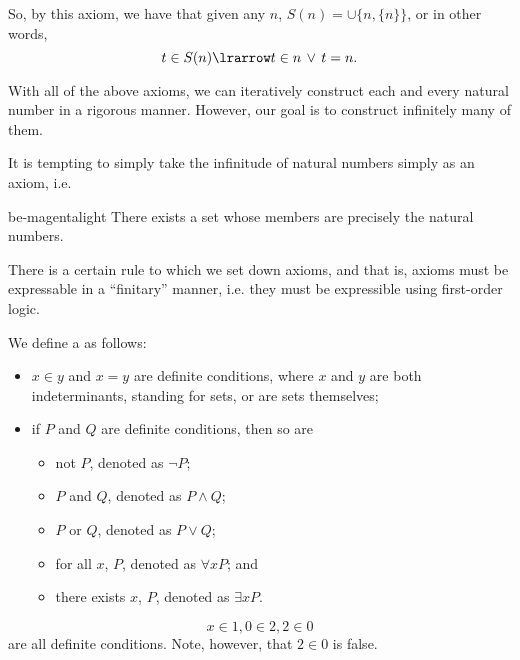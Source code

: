 \documentclass[notoc,notitlepage]{tufte-book}
\begin{document}
So, by this axiom, we have that given any $n$, $S(n) = \cup \{ n, \{ n \} \}$, or in other words,
\begin{equation*}
  t \in S(n) \lrarrow t \in n \, \lor \, t = n.
\end{equation*}

With all of the above axioms, we can iteratively construct each and every natural number in a rigorous manner. However, our goal is to construct infinitely many of them.

It is tempting to simply take the infinitude of natural numbers simply as an axiom, i.e.

\begin{quotebox}{be-magenta}{light}\label{sp:natural_numbers_axiom}
  There exists a set whose members are precisely the natural numbers.
\end{quotebox}

There is a certain rule to which we set down axioms, and that is, axioms must be expressable in a ``finitary'' manner, i.e. they must be expressible using first-order logic.

\begin{defn}
\label{defn:definite_condition}
  We define a  as follows:
  \begin{itemize}
    \item $x \in y$ and $x = y$ are definite conditions, where $x$ and $y$ are both indeterminants, standing for sets, or are sets themselves;
    \item if $P$ and $Q$ are definite conditions, then so are
      \begin{itemize}
        \item not $P$, denoted as $\neg P$;
        \item $P$ and $Q$, denoted as $P \land Q$;
        \item $P$ or $Q$, denoted as $P \lor Q$;
        \item for all $x$, $P$, denoted as $\forall x P$; and
        \item there exists $x$, $P$, denoted as $\exists x P$.
      \end{itemize}
  \end{itemize}
\end{defn}

\begin{eg}
  \begin{equation*}
    x \in 1, 0 \in 2 , 2 \in 0
  \end{equation*}
  are all definite conditions. Note, however, that $2 \in 0$ is false.
\end{eg}
\end{document}

